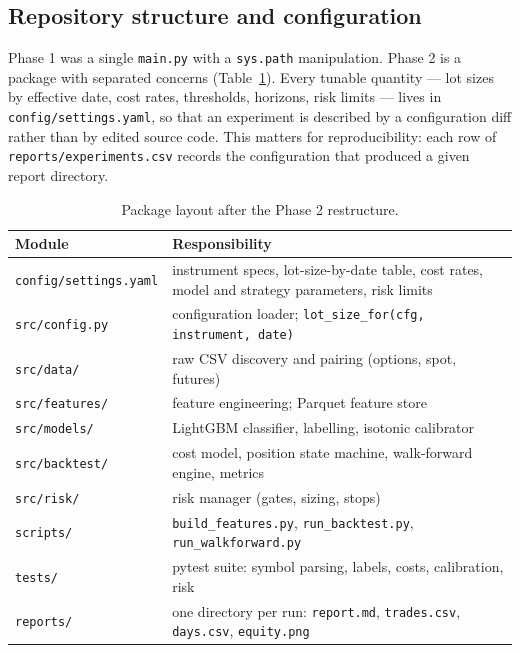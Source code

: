 \documentclass[11pt,a4paper]{article}
\newcommand{\code}[1]{\texttt{#1}}
\begin{document}
\subsection{Repository structure and configuration}

Phase 1 was a single \code{main.py} with a \code{sys.path} manipulation. Phase 2 is a
package with separated concerns (Table~\ref{tab:layout}). Every tunable quantity ---
lot sizes by effective date, cost rates, thresholds, horizons, risk limits --- lives in
\code{config/settings.yaml}, so that an experiment is described by a configuration diff
rather than by edited source code. This matters for reproducibility: each row of
\code{reports/experiments.csv} records the configuration that produced a given report
directory.

\begin{table}[H]
\centering\small
\begin{tabular}{@{}lp{9.4cm}@{}}
\toprule
\textbf{Module} & \textbf{Responsibility}\\
\midrule
\code{config/settings.yaml} & instrument specs, lot-size-by-date table, cost rates, model
and strategy parameters, risk limits\\
\code{src/config.py}        & configuration loader; \code{lot\_size\_for(cfg, instrument, date)}\\
\code{src/data/}            & raw CSV discovery and pairing (options, spot, futures)\\
\code{src/features/}        & feature engineering; Parquet feature store\\
\code{src/models/}          & LightGBM classifier, labelling, isotonic calibrator\\
\code{src/backtest/}        & cost model, position state machine, walk-forward engine, metrics\\
\code{src/risk/}            & risk manager (gates, sizing, stops)\\
\code{scripts/}             & \code{build\_features.py}, \code{run\_backtest.py}, \code{run\_walkforward.py}\\
\code{tests/}               & pytest suite: symbol parsing, labels, costs, calibration, risk\\
\code{reports/}             & one directory per run: \code{report.md}, \code{trades.csv}, \code{days.csv}, \code{equity.png}\\
\bottomrule
\end{tabular}
\caption{Package layout after the Phase 2 restructure.}
\label{tab:layout}
\end{table}
\end{document}
